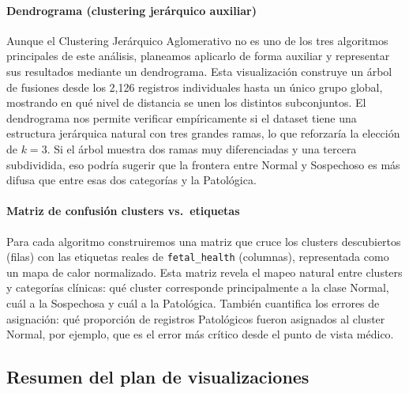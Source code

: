 \documentclass[12pt,letterpaper]{article}
\begin{document}
\paragraph{Dendrograma (clustering jerárquico auxiliar)}
Aunque el Clustering Jerárquico Aglomerativo no es uno de los tres algoritmos principales de este
análisis, planeamos aplicarlo de forma auxiliar y representar sus resultados mediante un dendrograma.
Esta visualización construye un árbol de fusiones desde los 2,126 registros individuales hasta un
único grupo global, mostrando en qué nivel de distancia se unen los distintos subconjuntos. El
dendrograma nos permite verificar empíricamente si el dataset tiene una estructura jerárquica
natural con tres grandes ramas, lo que reforzaría la elección de $k = 3$. Si el árbol muestra dos
ramas muy diferenciadas y una tercera subdividida, eso podría sugerir que la frontera entre Normal
y Sospechoso es más difusa que entre esas dos categorías y la Patológica.

\paragraph{Matriz de confusión clusters vs.\ etiquetas}
Para cada algoritmo construiremos una matriz que cruce los clusters descubiertos (filas) con las
etiquetas reales de \texttt{fetal\_health} (columnas), representada como un mapa de calor
normalizado. Esta matriz revela el mapeo natural entre clusters y categorías clínicas: qué cluster
corresponde principalmente a la clase Normal, cuál a la Sospechosa y cuál a la Patológica. También
cuantifica los errores de asignación: qué proporción de registros Patológicos fueron asignados al
cluster Normal, por ejemplo, que es el error más crítico desde el punto de vista médico.

\subsection{Resumen del plan de visualizaciones}
\end{document}
